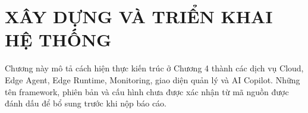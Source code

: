 \chapter{XÂY DỰNG VÀ TRIỂN KHAI HỆ THỐNG}

Chương này mô tả cách hiện thực kiến trúc ở Chương 4 thành các dịch vụ Cloud,
Edge Agent, Edge Runtime, Monitoring, giao diện quản lý và AI Copilot. Những tên
framework, phiên bản và cấu hình chưa được xác nhận từ mã nguồn được đánh dấu
để bổ sung trước khi nộp báo cáo.









